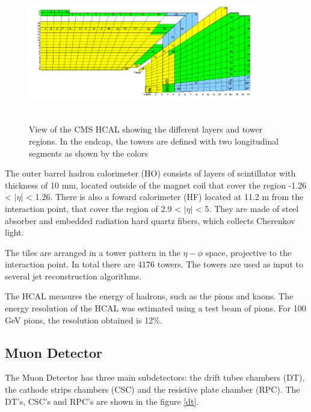 \begin{figure}[ht]
	\centering
	\includegraphics[width=10cm,height=6cm]{Chapter2/hcal.png}
	\caption[View of the CMS HCAL showing the different layers and tower regions. In the endcap, the towers are defined with two longitudinal segments as shown by the colors]{View of the CMS HCAL showing the different layers and tower regions. In the endcap, the towers are defined with two longitudinal segments as shown by the colors\cite{cms-manual}}\label{hcal}
\end{figure}
The outer barrel hadron calorimeter (HO) consists of layers of scintillator with thickness of 10 mm, located outside of the
magnet coil that cover the region -1.26 < $|\eta|$ < 1.26.
There is also a foward calorimeter (HF) located at 11.2 m from the interaction point, that cover the region of 2.9 < $|\eta|$ < 5. They are made of
steel absorber and embedded radiation hard quartz fibers, which collects 
Cherenkov light\cite{cms-manual}.%

 
The tiles are arranged in a tower pattern in the $\eta-\phi$ space, projective to the interaction point. In total there
are 4176 towers. The towers are used as input to several jet reconstruction algorithms.

The HCAL measures the energy of hadrons, such as the pions and kaons. 
The energy resolution of the HCAL was estimated using a test beam of pions. For 100 GeV pions, the resolution obtained is 12$\%$.

\subsection{Muon Detector}
The Muon Detector has three main subdetectors: the drift tubes chambers (DT), the cathode strips chambers (CSC) and the resistive plate chamber (RPC). 
The DT's, CSC's and RPC's are shown in the figure \ref{dt}.
 
